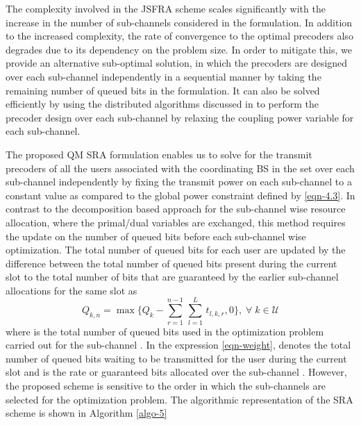 
The complexity involved in the \ac{JSFRA} scheme scales significantly with the increase in the number of sub-channels considered in the formulation. In addition to the increased complexity, the rate of convergence to the optimal precoders also degrades due to its dependency on the problem size. In order to mitigate this, we provide an alternative sub-optimal solution, in which the precoders are designed over each sub-channel independently in a sequential manner by taking the remaining number of queued bits in the formulation. It can also be solved efficiently by using the distributed algorithms discussed in \cite{palomar2006tutorial,boyd2011distributed} to perform the precoder design over each sub-channel by relaxing the coupling power variable for each sub-channel. 

The proposed \acl{QM} \ac{SRA} formulation enables us to solve for the transmit precoders of all the users associated with the coordinating \ac{BS} in the set  over each sub-channel independently by fixing the transmit power on each sub-channel to a constant value  as compared to the global power constraint defined by \eqref{eqn-4.3}. In contrast to the decomposition based approach for the sub-channel wise resource allocation, where the primal/dual variables are exchanged, this method requires the update on the number of queued bits before each sub-channel wise optimization. The total number of queued bits for each user are updated by the difference between the total number of queued bits present during the current slot to the total number of bits that are guaranteed by the earlier sub-channel allocations for the same slot as
\begin{equation}
Q_{k,n} = \max{\Big \lbrace Q_k - \sum_{r = 1}^{n-1} \, \sum_{l = 1}^{L} \, t_{l,k,r} ,0 \Big \rbrace }, \; \forall \; k \in \mathcal{U}
\label{eqn-weight}
\end{equation}
where  is the total number of queued bits used in the optimization problem carried out for the sub-channel . In the expression \eqref{eqn-weight},  denotes the total number of queued bits waiting to be transmitted for the user  during the current slot and  is the rate or guaranteed bits allocated over the sub-channel . However, the proposed scheme is sensitive to the order in which the sub-channels are selected for the optimization problem. The algorithmic representation of the \ac{SRA} scheme is shown in Algorithm \ref{algo-5}
